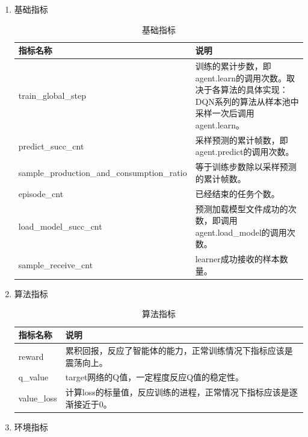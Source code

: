 \begin{enumerate}
    \item 基础指标

\begin{table}[H]
    \begin{tabularx}{1\textwidth}{ l X } %
        \hline %
        \textbf{指标名称} & \textbf{说明}  \\
        \hline
    train\_global\_step&训练的累计步数，即agent.learn的调用次数。取决于各算法的具体实现：DQN系列的算法从样本池中采样一次后调用agent.learn。\\
    predict\_succ\_cnt&采样预测的累计帧数，即agent.predict的调用次数。\\
    sample\_production\_and\_consumption\_ratio&等于训练步数除以采样预测的累计帧数。\\
    episode\_cnt&已经结束的任务个数。\\
    load\_model\_succ\_cnt&预测加载模型文件成功的次数，即调用agent.load\_model的调用次数。\\
    sample\_receive\_cnt&learner成功接收的样本数量。\\
        \hline
    \end{tabularx}
    \centering
    \caption{基础指标}
    \label{monitor-basic}
\end{table}


    \item 算法指标

\begin{table}[H]
    \begin{tabularx}{1\textwidth}{ l X } %
        \hline %
        \textbf{指标名称} & \textbf{说明}  \\
        \hline
        reward&累积回报，反应了智能体的能力，正常训练情况下指标应该是震荡向上。\\
        q\_value&target网络的Q值，一定程度反应Q值的稳定性。\\
        value\_loss&计算loss的标量值，反应训练的进程，正常情况下指标应该是逐渐接近于0。\\
        \hline
    \end{tabularx}
    \centering
    \caption{算法指标}
    \label{monitor-alg}
\end{table}

    \item 环境指标


\end{enumerate}
